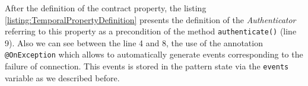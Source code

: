 After the definition of the contract property, the listing \ref{listing:TemporalPropertyDefinition} presents the definition of the \textit{Authenticator} referring to this property as a precondition of the method \texttt{authenticate()} (line 9). Also we can see between the line 4 and 8, the use of the annotation \texttt{@OnException} which allows to automatically generate events corresponding to the failure of connection. This events is stored in the pattern state via the \texttt{events} variable as we described before.


